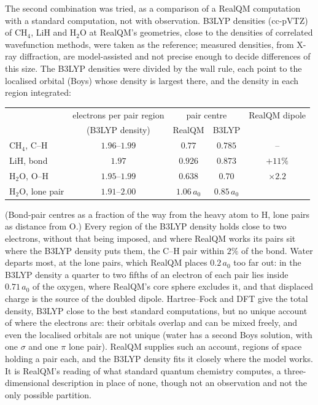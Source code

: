 \documentclass[11pt]{article}
\begin{document}
The second combination was tried, as a comparison of a RealQM computation with a standard computation, not with
observation. B3LYP densities (cc-pVTZ) of CH$_4$, LiH and H$_2$O at RealQM's geometries, close to the densities of
correlated wavefunction methods, were taken as the reference; measured densities, from X-ray diffraction, are
model-assisted and not precise enough to decide differences of this size. The B3LYP densities were divided by the wall rule, each point to the localised orbital (Boys) whose density is largest there, and the
density in each region integrated:
\begin{center}
\small
\begin{tabular}{lcccc}
\toprule
 & electrons per pair region & \multicolumn{2}{c}{pair centre} & RealQM dipole \\
 & (B3LYP density) & RealQM & B3LYP & \\
\midrule
CH$_4$, C--H & $1.96$--$1.99$ & $0.77$ & $0.785$ & -- \\
LiH, bond & $1.97$ & $0.926$ & $0.873$ & $+11\%$ \\
H$_2$O, O--H & $1.95$--$1.99$ & $0.638$ & $0.70$ & $\times 2.2$ \\
H$_2$O, lone pair & $1.91$--$2.00$ & $1.06\,a_0$ & $0.85\,a_0$ & \\
\bottomrule
\end{tabular}
\end{center}
(Bond-pair centres as a fraction of the way from the heavy atom to H, lone pairs as distance from O.) Every region
of the B3LYP density holds close to two electrons, without that being imposed, and where RealQM works its pairs
sit where the B3LYP density puts them, the C--H pair within $2\%$ of the bond. Water departs most, at the lone
pairs, which RealQM places $0.2\,a_0$ too far out: in the B3LYP density a quarter to two fifths of an electron of
each pair lies inside $0.71\,a_0$ of the oxygen, where RealQM's core sphere excludes it, and that displaced charge
is the source of the doubled dipole. Hartree--Fock and DFT give the total density, B3LYP close to the best standard computations, but no unique account
of where the electrons are: their orbitals overlap and can be mixed freely, and even the localised orbitals are not
unique (water has a second Boys solution, with one $\sigma$ and one $\pi$ lone pair). RealQM supplies such an account,
regions of space holding a pair each, and the B3LYP density fits it closely where the model works. It is RealQM's
reading of what standard quantum chemistry computes, a three-dimensional description in place of none, though not an
observation and not the only possible partition.
\end{document}
